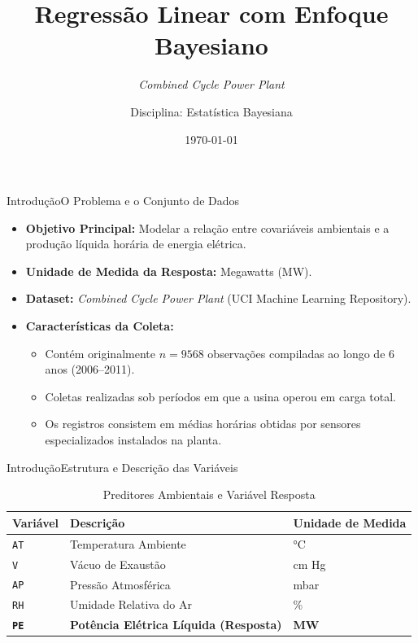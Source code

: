 \documentclass[10pt,aspectratio=169]{beamer}
\title[Regressão Linear Bayesiana]{Regressão Linear com Enfoque Bayesiano}
\subtitle{\textit{Combined Cycle Power Plant}}
\author[Estatística Bayesiana]{Disciplina: Estatística Bayesiana}
\date{\today}
\begin{document}
\begin{frame}[plain]
    \titlepage
\end{frame}

\begin{frame}{Introdução}{O Problema e o Conjunto de Dados}
    \begin{itemize}
        \item \textbf{Objetivo Principal:} Modelar a relação entre covariáveis ambientais e a produção líquida horária de energia elétrica.
        \item \textbf{Unidade de Medida da Resposta:} Megawatts (MW).
        \item \textbf{Dataset:} \textit{Combined Cycle Power Plant} (UCI Machine Learning Repository).
        \item \textbf{Características da Coleta:}
        \begin{itemize}
            \item Contém originalmente $n = 9568$ observações compiladas ao longo de 6 anos (2006--2011).
            \item Coletas realizadas sob períodos em que a usina operou em carga total.
            \item Os registros consistem em médias horárias obtidas por sensores especializados instalados na planta.
        \end{itemize}
    \end{itemize}
\end{frame}

\begin{frame}{Introdução}{Estrutura e Descrição das Variáveis}
    \begin{table}
        \centering
        \caption{Preditores Ambientais e Variável Resposta}
        \small
        \begin{tabular}{lll}
            \toprule
            \textbf{Variável} & \textbf{Descrição} & \textbf{Unidade de Medida} \\
            \midrule
            \texttt{AT} & Temperatura Ambiente & °C \\
            \texttt{V}  & Vácuo de Exaustão & cm Hg \\
            \texttt{AP} & Pressão Atmosférica & mbar \\
            \texttt{RH} & Umidade Relativa do Ar & \% \\
            \midrule
            \textbf{\texttt{PE}} & \textbf{Potência Elétrica Líquida (Resposta)} & \textbf{MW} \\
            \bottomrule
        \end{tabular}
    \end{table}
\end{frame}
\end{document}
